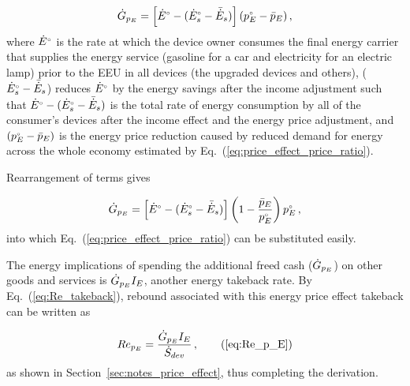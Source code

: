 \begin{equation}
  \dot{G}_{p_E} = \left[ {}{\dot{E}}^{\scriptscriptstyle \circ} - ({}{\dot{E}}^{\scriptscriptstyle \circ}_s - \bar{\dot{E}}_s) \right] ({}{p}^{\scriptscriptstyle \circ}_E - \bar{p}_E) \, ,
\end{equation}
%
where ${}{\dot{E}}^{\scriptscriptstyle \circ}$ is the rate at which the device owner
consumes the final energy carrier that supplies
the energy service
(gasoline for a car and
electricity for an electric lamp) 
prior to the EEU
in all devices (the upgraded devices and others), 
(${}{\dot{E}}^{\scriptscriptstyle \circ}_s - \bar{\dot{E}}_s$) reduces 
${}{\dot{E}}^{\scriptscriptstyle \circ}$ by the energy savings after the income adjustment
such that
${}{\dot{E}}^{\scriptscriptstyle \circ} - ({}{\dot{E}}^{\scriptscriptstyle \circ}_s - \bar{\dot{E}}_s)$
is the total rate of energy consumption by all of the 
consumer's devices
after the income effect and the energy price adjustment, and
$({}{p}^{\scriptscriptstyle \circ}_E - \bar{p}_E)$ is the energy price reduction
caused by reduced demand for energy across 
the whole economy estimated by 
Eq.~(\ref{eq:price_effect_price_ratio}). 

Rearrangement of terms gives

\begin{equation}
  \dot{G}_{p_E} = \left[ {}{\dot{E}}^{\scriptscriptstyle \circ} - ({}{\dot{E}}^{\scriptscriptstyle \circ}_s - \bar{\dot{E}}_s) \right] \left( 1 - \frac{\bar{p}_E}{{}{p}^{\scriptscriptstyle \circ}_E} \right) {}{p}^{\scriptscriptstyle \circ}_E \, ,
\end{equation}
%
into which Eq.~(\ref{eq:price_effect_price_ratio})
can be substituted easily.

The energy implications of spending the additional freed cash
($\dot{G}_{p_E}$) on other goods and services is
$\dot{G}_{p_E} I_E$,
another energy takeback rate.
By Eq.~(\ref{eq:Re_takeback}),
rebound associated with this energy price effect takeback
can be written as

\begin{equation}
  Re_{p_E} = \frac{\rate{G}_{p_E} I_E}{\Sdot} \, , \tag{\ref{eq:Re_p_E}}
\end{equation}
%
as shown in Section~\ref{sec:notes_price_effect},
thus completing the derivation.



